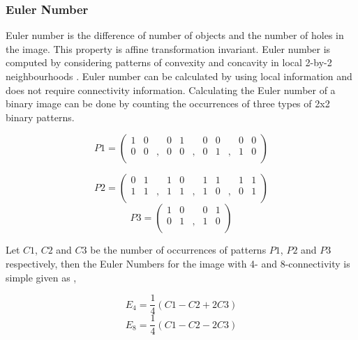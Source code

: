 \documentclass[12pt,a4paper,oneside]{article}
\numberwithin{equation}{section}
\numberwithin{algorithm}{section}
\begin{document}
	
	\subsubsection{Euler Number}
	\label{euler_number}
	Euler number is the difference of number of objects and the number of holes in the image. This property is affine transformation invariant. Euler number is computed by considering patterns of convexity and concavity in local 2-by-2 neighbourhoods \cite{Pratt1991}. Euler number can be calculated by using local information and does not require connectivity information. Calculating the Euler number of a binary image can be done by counting the occurrences of three types of 2x2 binary patterns.
	
	$$ P1=
	\left(
	  \begin{array}{ccccccccccc}
	    1 & 0 &  & 0 & 1 &  & 0 & 0 &  & 0 & 0 \\
	    0 & 0 &, & 0 & 0 &, & 0 & 1 &, & 1 & 0 \\
	  \end{array}
	\right)
	$$
	
	$$ P2=
	\left(
	\begin{array}{ccccccccccc}
	    0 & 1 &  & 1 & 0 &  & 1 & 1 &  & 1 & 1 \\
	    1 & 1 &, & 1 & 1 &, & 1 & 0 &, & 0 & 1 \\
	\end{array}
	\right)
	$$
	$$ P3=
	\left(
	\begin{array}{ccccc}
	1&0& &0&1 \\
	0&1&,&1&0 \\
	\end{array}
	\right)
	$$
	
	
	
	Let $C1$, $C2$ and $C3$ be the number of occurrences of patterns $P1$, $P2$ and $P3$ respectively, then the Euler Numbers for the image with 4- and 8-connectivity is simple given as \cite{Pratt1991},
	
	\begin{equation}
	E_4=\frac{1}{4}(C1-C2+2C3)
	\end{equation}
	\begin{equation}
	E_8=\frac{1}{4}(C1-C2-2C3)
	\end{equation}
	
\end{document}

